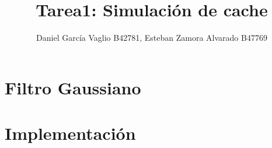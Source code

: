 \documentclass {article}
\begin{document}
\title{Tarea1: Simulación de cache}
\author{Daniel García Vaglio B42781, Esteban Zamora Alvarado B47769}

\maketitle


\section{Filtro Gaussiano}


\section{Implementación}
\end{document}
